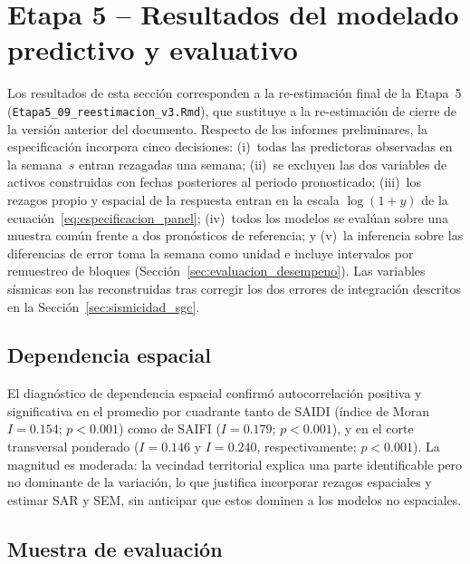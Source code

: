 \section{Etapa 5 – Resultados del modelado predictivo y evaluativo}
\label{sec:resultados-etapa5}

Los resultados de esta sección corresponden a la re-estimación final de la Etapa~5 (\texttt{Etapa5\_09\_reestimacion\_v3.Rmd}), que sustituye a la re-estimación de cierre de la versión anterior del documento. Respecto de los informes preliminares, la especificación incorpora cinco decisiones: (i)~todas las predictoras observadas en la semana~$s$ entran rezagadas una semana; (ii)~se excluyen las dos variables de activos construidas con fechas posteriores al periodo pronosticado; (iii)~los rezagos propio y espacial de la respuesta entran en la escala $\log(1+y)$ de la ecuación~\eqref{eq:especificacion_panel}; (iv)~todos los modelos se evalúan sobre una muestra común frente a dos pronósticos de referencia; y (v)~la inferencia sobre las diferencias de error toma la semana como unidad e incluye intervalos por remuestreo de bloques (Sección~\ref{sec:evaluacion_desempeno}). Las variables sísmicas son las reconstruidas tras corregir los dos errores de integración descritos en la Sección~\ref{sec:sismicidad_sgc}.

\subsection{Dependencia espacial}
\label{sec:resultados_moran}

El diagnóstico de dependencia espacial confirmó autocorrelación positiva y significativa en el promedio por cuadrante tanto de SAIDI (índice de Moran $I=0{.}154$; $p<0{.}001$) como de SAIFI ($I=0{.}179$; $p<0{.}001$), y en el corte transversal ponderado ($I=0{.}146$ y $I=0{.}240$, respectivamente; $p<0{.}001$). La magnitud es moderada: la vecindad territorial explica una parte identificable pero no dominante de la variación, lo que justifica incorporar rezagos espaciales y estimar SAR y SEM, sin anticipar que estos dominen a los modelos no espaciales.

\subsection{Muestra de evaluación}
\label{sec:resultados_muestra}

